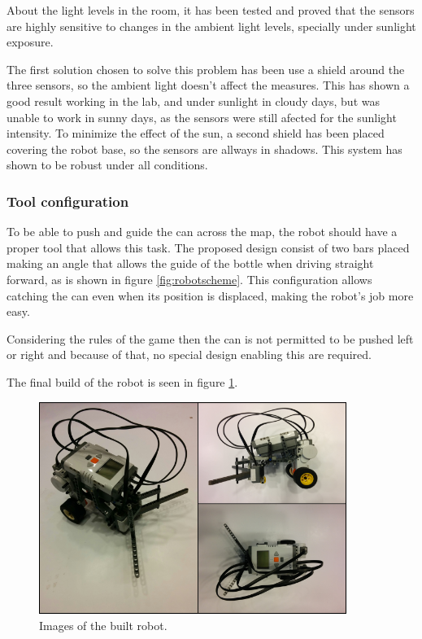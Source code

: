 About the light levels in the room, it has been tested and proved that the sensors are highly sensitive to changes in 
the ambient light levels, specially under sunlight exposure. 

The first solution chosen to solve this problem has been use a shield around the three sensors, so the ambient light 
doesn't affect the measures.
This has shown a good result working in the lab, and under sunlight in cloudy days, but was unable to work in sunny days,
as the sensors were still afected for the sunlight intensity.
To minimize the effect of the sun, a second shield has been placed covering the robot base, so the sensors are allways in
shadows.
This system has shown to be robust under all conditions.



\subsubsection{Tool configuration}

To be able to push and guide the can across the map, the robot should have a proper tool that allows this task. 
The proposed design consist of two bars placed making an angle that allows the guide of the bottle when driving straight forward, as is shown in figure \ref{fig:robotscheme}.
This configuration allows catching the can even when its position is displaced, making the robot's job more easy.

Considering the rules of the game then the can is not permitted to be pushed left or right and because of that, no special design enabling this are required.


The final build of the robot is seen in figure \ref{fig:robotImage}.

\begin{figure}[H]
\includegraphics[width=10cm]{Fig1.png}
\centering
\caption{Images of the built robot.}
\label{fig:robotImage}
\end{figure}

